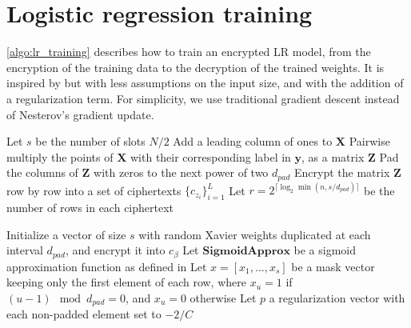 \documentclass[a4paper,11pt,oneside]{report}
\begin{document}
\section{Logistic regression training}

\autoref{algo:lr_training} describes how to train an encrypted LR model, from the encryption of the training data to the decryption of the trained weights.
It is inspired by \cite{kim_logistic_2018} but with less assumptions on the input size, and with the addition of a regularization term. 
For simplicity, we use traditional gradient descent instead of Nesterov's gradient update.

\begin{algorithm}

  \LinesNumbered
  \DontPrintSemicolon
  \SetAlgoLined

  
  Let $s$ be the number of slots $N / 2$\;
  \;
  Add a leading column of ones to $\mathbf{X}$\;
  Pairwise multiply the points of $\mathbf{X}$ with their corresponding label in $\mathbf{y}$, as a matrix $\mathbf{Z}$\;
  Pad the columns of $\mathbf{Z}$ with zeros to the next power of two $d_{pad}$\;
  Encrypt the matrix $\mathbf{Z}$ row by row into a set of ciphertexts $\{c_{z_i}\}_{i=1}^L$\;
  Let $r = 2^{\lceil\log_2\min(n, s / d_{pad})\rceil}$ be the number of rows in each ciphertext\;

  \;
  Initialize a vector of size $s$ with random Xavier weights duplicated at each interval $d_{pad}$, and encrypt it into $c_\beta$\;
  Let $\mathbf{SigmoidApprox}$ be a sigmoid approximation function as defined in \cite{kim_logistic_2018}\;
  Let $x = [x_1, ..., x_s]$ be a mask vector keeping only the first element of each row, where $x_u = 1$ if $(u-1) \mod d_{pad}=0$, and $x_u=0$ otherwise\;
  Let $p$ a regularization vector with each non-padded element set to $-2/C$\;


\end{algorithm}
\end{document}
